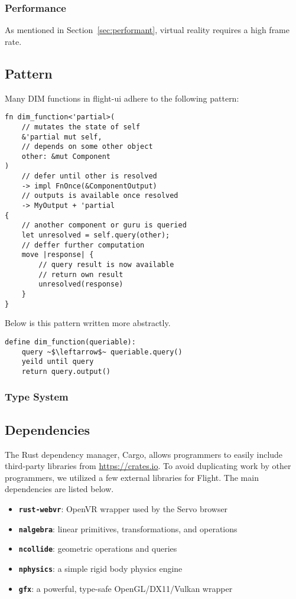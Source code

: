 \documentclass[conference,12pt]{IEEEtran}
\begin{document}
\subsubsection{Performance}
As mentioned in Section~\ref{sec:performant}, virtual reality requires a high
frame rate.

\subsection{Pattern}

Many DIM functions in flight-ui adhere to the following pattern:

\begin{verbatim}
fn dim_function<'partial>(
    // mutates the state of self
    &'partial mut self,
    // depends on some other object
    other: &mut Component
)
    // defer until other is resolved
    -> impl FnOnce(&ComponentOutput)
    // outputs is available once resolved
    -> MyOutput + 'partial
{
    // another component or guru is queried
    let unresolved = self.query(other);
    // deffer further computation
    move |response| {
        // query result is now available
        // return own result
        unresolved(response)
    }
}
\end{verbatim}

Below is this pattern written more abstractly.

\begin{verbatim}
define dim_function(queriable):
    query ~$\leftarrow$~ queriable.query()
    yeild until query
    return query.output()
\end{verbatim}

\subsubsection{Type System}


\subsection{Dependencies}
The Rust dependency manager, Cargo, allows programmers to easily include
third-party libraries from \url{https://crates.io}. To avoid duplicating work
by other programmers, we utilized a few external libraries for Flight. The main
dependencies are listed below.
\begin{itemize}
    \item \textbf{\texttt{rust-webvr}}: OpenVR wrapper used by the Servo browser
    \item \textbf{\texttt{nalgebra}}: linear primitives, transformations, and operations
    \item \textbf{\texttt{ncollide}}: geometric operations and queries
    \item \textbf{\texttt{nphysics}}: a simple rigid body physics engine
    \item \textbf{\texttt{gfx}}: a powerful, type-safe OpenGL/DX11/Vulkan wrapper
\end{itemize}
\end{document}
